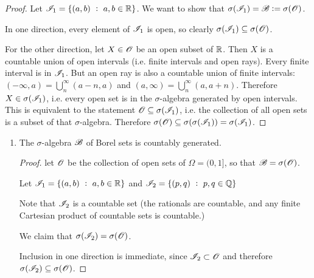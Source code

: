 \begin{enumerate}
\begin{proof}
    Let $\mathscr I_1 = \{(a, b) ~:~ a, b \in \mathbb{R}\}$. We want to show that $\sigma(\mathscr I_1) = \mathscr B := \sigma(\mathscr O)$.

    In one direction, every element of $\mathscr I_1$ is open, so clearly $\sigma(\mathscr I_1) \subseteq \sigma(\mathscr O)$.

    For the other direction, let $X \in \mathscr O$ be an open subset of $\mathbb{R}$. Then $X$ is a countable union of
    open intervals (i.e. finite intervals and open rays). Every finite interval is in $\mathscr I_1$. But an open
    ray is also a countable union of finite intervals: $(-\infty, a) = \bigcup_n^\infty (a-n, a)$
    and $(a, \infty) = \bigcup_n^\infty (a, a + n)$. Therefore $X \in \sigma(\mathscr I_1)$, i.e. every open set
    is in the $\sigma$-algebra generated by open intervals. This is equivalent to the
    statement $\mathscr O \subseteq \sigma(\mathscr I_1)$, i.e. the collection of all open sets is a subset of
    that $\sigma$-algebra. Therefore $\sigma(\mathscr O) \subseteq \sigma(\sigma(\mathscr I_1)) = \sigma(\mathscr I_1)$.
  \end{proof}

  \begin{enumerate}[label=(\alph*)]

  \item
    \begin{claim*}
      The $\sigma$-algebra $\mathscr B$ of Borel sets is countably generated.
    \end{claim*}
    \begin{proof}
      let $\mathscr O$ be the collection of open sets of $\Omega = (0, 1]$, so that $\mathscr B = \sigma(\mathscr O)$.

      Let $\mathscr I_1 = \{(a, b) ~:~ a, b \in \mathbb{R}\}$ and $\mathscr I_2 = \{(p, q) ~:~ p, q \in \mathbb{Q}\}$

      Note that $\mathscr I_2$ is a countable set (the rationals are countable, and any finite Cartesian product of
      countable sets is countable.)

      We claim that $\sigma(\mathscr I_2) = \sigma(\mathscr O)$.

      Inclusion in one direction is immediate, since $\mathscr I_2 \subset \mathscr O$ and
      therefore $\sigma(\mathscr I_2) \subseteq\sigma(\mathscr O)$.


\end{proof}
\end{enumerate}
\end{enumerate}
